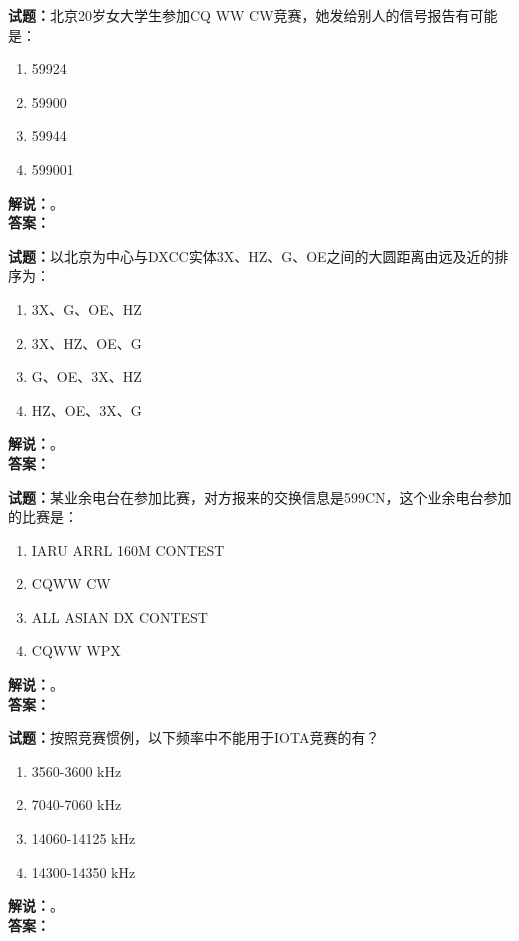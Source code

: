 \documentclass{ctexbook}
\begin{document}
\bigskip

\noindent\textbf{试题：}北京20岁女大学生参加CQ WW CW竞赛，她发给别人的信号报告有可能是：
\begin{enumerate}[leftmargin=3em]
  \item 59924
  \item 59900
  \item 59944
  \item 599001
\end{enumerate}
\noindent\textbf{解说：}\textbf{}。\\\noindent\textbf{答案：}

\bigskip

\noindent\textbf{试题：}以北京为中心与DXCC实体3X、HZ、G、OE之间的大圆距离由远及近的排序为：
\begin{enumerate}[leftmargin=3em]
  \item 3X、G、OE、HZ
  \item 3X、HZ、OE、G
  \item G、OE、3X、HZ
  \item HZ、OE、3X、G
\end{enumerate}
\noindent\textbf{解说：}\textbf{}。\\\noindent\textbf{答案：}

\bigskip

\noindent\textbf{试题：}某业余电台在参加比赛，对方报来的交换信息是599CN，这个业余电台参加的比赛是：
\begin{enumerate}[leftmargin=3em]
  \item IARU ARRL 160M CONTEST
  \item CQWW CW
  \item ALL ASIAN DX CONTEST
  \item CQWW WPX
\end{enumerate}
\noindent\textbf{解说：}\textbf{}。\\\noindent\textbf{答案：}

\bigskip

\noindent\textbf{试题：}按照竞赛惯例，以下频率中不能用于IOTA竞赛的有？
\begin{enumerate}[leftmargin=3em]
  \item 3560-3600 \unit{\kHz}
  \item 7040-7060 \unit{\kHz}
  \item 14060-14125 \unit{\kHz}
  \item 14300-14350 \unit{\kHz}
\end{enumerate}
\noindent\textbf{解说：}\textbf{}。\\\noindent\textbf{答案：}
\end{document}
